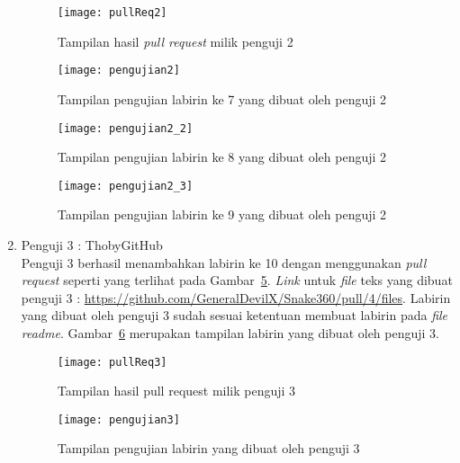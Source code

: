 \begin{enumerate}
	\begin{figure}[H]
		\centering  
		\texttt{[image: pullReq2]}  
		\caption[Tampilan hasil \textit{pull request} milik penguji 2]{Tampilan hasil \textit{pull request} milik penguji 2}
		\label{fig:pullReq2} 
	\end{figure}
	
	\begin{figure}[H]
		\centering  
		\texttt{[image: pengujian2]}
		\caption[Tampilan pengujian labirin ke 7 yang dibuat oleh penguji 2]{Tampilan pengujian labirin ke 7 yang dibuat oleh penguji 2}
		\label{fig:pengujian2} 
	\end{figure}
	
	\begin{figure}[H]
		\centering  
		\texttt{[image: pengujian2\_2]}  
		\caption[Tampilan pengujian labirin ke 8 yang dibuat oleh penguji 2]{Tampilan pengujian labirin ke 8 yang dibuat oleh penguji 2}
		\label{fig:pengujian2_2} 
	\end{figure}
	
	\begin{figure}[H]
		\centering  
		\texttt{[image: pengujian2\_3]}  
		\caption[Tampilan pengujian labirin ke 9 yang dibuat oleh penguji 2]{Tampilan pengujian labirin ke 9 yang dibuat oleh penguji 2}
		\label{fig:pengujian2_3} 
	\end{figure}
	
	\item Penguji 3 : ThobyGitHub\\
	Penguji 3 berhasil menambahkan labirin ke 10 dengan menggunakan \textit{pull request} seperti yang terlihat pada Gambar~\ref{fig:pullReq3}. \textit{Link} untuk \textit{file} teks yang dibuat penguji 3 : \url{https://github.com/GeneralDevilX/Snake360/pull/4/files}. Labirin yang dibuat oleh penguji 3 sudah sesuai ketentuan membuat labirin pada \textit{file readme}. Gambar~\ref{fig:pengujian3} merupakan tampilan labirin yang dibuat oleh penguji 3.
	
	\begin{figure}[H]
		\centering  
		\texttt{[image: pullReq3]}  
		\caption[Tampilan hasil pull request milik penguji 3]{Tampilan hasil pull request milik penguji 3}
		\label{fig:pullReq3} 
	\end{figure}
	
	\begin{figure}[H]
		\centering  
		\texttt{[image: pengujian3]}  
		\caption[Tampilan pengujian labirin yang dibuat oleh penguji 3]{Tampilan pengujian labirin yang dibuat oleh penguji 3}
		\label{fig:pengujian3} 
	\end{figure}
	

\end{enumerate}
